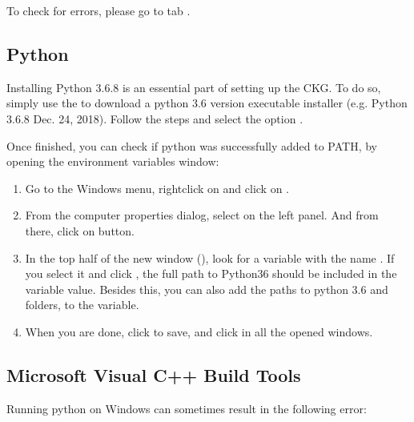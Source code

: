 \documentclass[letterpaper,10pt,english]{sphinxmanual}
\begin{document}
To check for errors, please go to tab .


\subsection{Python}
\label{\detokenize{intro/getting-started-with-windows:python}}
Installing Python 3.6.8 is an essential part of setting up the CKG.
To do so, simply use the  to download a python 3.6 version executable installer (e.g. Python 3.6.8 \sphinxhyphen{} Dec. 24, 2018).
Follow the steps and select the option .

Once finished, you can check if python was successfully added to PATH, by opening the environment variables window:
\begin{enumerate}
%
\item {} 
Go to the Windows menu, right\sphinxhyphen{}click on  and click on .

\item {} 
From the computer properties dialog, select  on the left panel. And from there, click on  button.

\item {} 
In the top half of the new window (), look for a variable with the name . If you select it and click , the full path to Python36 should be included in the variable value. Besides this, you can also add the paths to python 3.6  and  folders, to the  variable.

\item {} 
When you are done, click  to save, and click  in all the opened windows.

\end{enumerate}


\subsection{Microsoft Visual C++ Build Tools}
\label{\detokenize{intro/getting-started-with-windows:microsoft-visual-c-build-tools}}
Running python on Windows can sometimes result in the following error:
\end{document}
